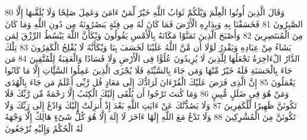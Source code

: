 \documentclass[20pt,a4paper]{article}
\begin{document}
{\tiny\colorbox{cl_aya}{80}} وَقَالَ الَّذِينَ أُوتُوا الْعِلْمَ وَيْلَكُمْ ثَوَابُ اللَّهِ خَيْرٌ لِّمَنْ ءَامَنَ وَعَمِلَ صَلِحًا وَلَا يُلَقَّىهَا إِلَّا الصَّبِرُونَ
{\tiny\colorbox{cl_aya}{81}} فَخَسَفْنَا بِهِ وَبِدَارِهِ الْأَرْضَ فَمَا كَانَ لَهُ مِن فِئَةٍ يَنصُرُونَهُ مِن دُونِ اللَّهِ وَمَا كَانَ مِنَ الْمُنتَصِرِينَ
{\tiny\colorbox{cl_aya}{82}} وَأَصْبَحَ الَّذِينَ تَمَنَّوْا مَكَانَهُ بِالْأَمْسِ يَقُولُونَ وَيْكَأَنَّ اللَّهَ يَبْسُطُ الرِّزْقَ لِمَن يَشَاءُ مِنْ عِبَادِهِ وَيَقْدِرُ لَوْلَا أَن مَّنَّ اللَّهُ عَلَيْنَا لَخَسَفَ بِنَا وَيْكَأَنَّهُ لَا يُفْلِحُ الْكَفِرُونَ
{\tiny\colorbox{cl_aya}{83}} تِلْكَ الدَّارُ الْءَاخِرَةُ نَجْعَلُهَا لِلَّذِينَ لَا يُرِيدُونَ عُلُوًّا فِى الْأَرْضِ وَلَا فَسَادًا وَالْعَقِبَةُ لِلْمُتَّقِينَ
{\tiny\colorbox{cl_aya}{84}} مَن جَاءَ بِالْحَسَنَةِ فَلَهُ خَيْرٌ مِّنْهَا وَمَن جَاءَ بِالسَّيِّئَةِ فَلَا يُجْزَى الَّذِينَ عَمِلُوا السَّئَِّاتِ إِلَّا مَا كَانُوا يَعْمَلُونَ
{\tiny\colorbox{cl_aya}{85}} إِنَّ الَّذِى فَرَضَ عَلَيْكَ الْقُرْءَانَ لَرَادُّكَ إِلَى مَعَادٍ قُل رَّبِّى أَعْلَمُ مَن جَاءَ بِالْهُدَى وَمَنْ هُوَ فِى ضَلَلٍ مُّبِينٍ
{\tiny\colorbox{cl_aya}{86}} وَمَا كُنتَ تَرْجُوا أَن يُلْقَى إِلَيْكَ الْكِتَبُ إِلَّا رَحْمَةً مِّن رَّبِّكَ فَلَا تَكُونَنَّ ظَهِيرًا لِّلْكَفِرِينَ
{\tiny\colorbox{cl_aya}{87}} وَلَا يَصُدُّنَّكَ عَنْ ءَايَتِ اللَّهِ بَعْدَ إِذْ أُنزِلَتْ إِلَيْكَ وَادْعُ إِلَى رَبِّكَ وَلَا تَكُونَنَّ مِنَ الْمُشْرِكِينَ
{\tiny\colorbox{cl_aya}{88}} وَلَا تَدْعُ مَعَ اللَّهِ إِلَهًا ءَاخَرَ لَا إِلَهَ إِلَّا هُوَ كُلُّ شَىْءٍ هَالِكٌ إِلَّا وَجْهَهُ لَهُ الْحُكْمُ وَإِلَيْهِ تُرْجَعُونَ
\end{document}
